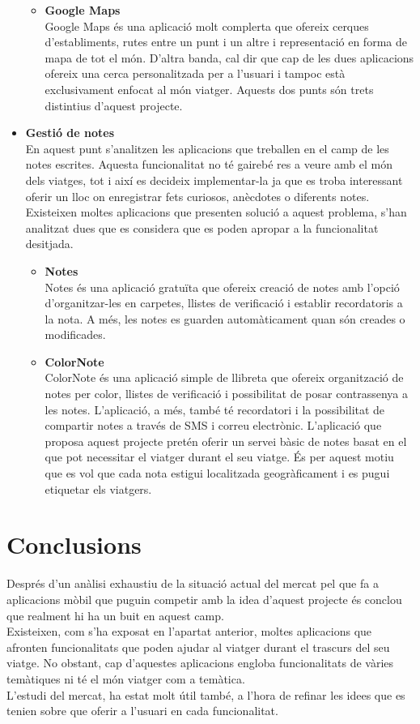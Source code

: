 \begin{itemize}
\begin{itemize}
\item{\textbf{Google Maps}}\\
Google Maps és una aplicació molt complerta que ofereix cerques d’establiments, rutes entre un punt i un altre i representació en forma de mapa de tot el món.
D’altra banda, cal dir que cap de les dues aplicacions ofereix una cerca personalitzada per a l’usuari i tampoc està exclusivament enfocat al món viatger. Aquests dos punts són trets distintius d’aquest projecte.
\end{itemize}
\item{\textbf{Gestió de notes}}\\
En aquest punt s’analitzen les aplicacions que treballen en el camp de les notes escrites. Aquesta funcionalitat no té gairebé res a veure amb el món dels viatges, tot i així es decideix implementar-la ja que es troba interessant oferir un lloc on enregistrar fets curiosos, anècdotes o diferents notes.\\
Existeixen moltes aplicacions que presenten solució a aquest problema, s’han analitzat dues que es considera que es poden apropar a la funcionalitat desitjada.
\begin{itemize}
\item{\textbf{Notes}}\\
Notes és una aplicació gratuïta que ofereix creació de notes amb l’opció d’organitzar-les en carpetes, llistes de verificació i establir recordatoris a la nota. A més, les notes es guarden automàticament quan són creades o modificades. 
\item{\textbf{ColorNote}}\\
ColorNote és una aplicació simple de llibreta que ofereix organització de notes per color, llistes de verificació i possibilitat de posar contrassenya a les notes. L’aplicació, a més, també té recordatori i la possibilitat de compartir notes a través de SMS i correu electrònic.
L’aplicació que proposa aquest projecte pretén oferir un servei bàsic de notes basat en el que pot necessitar el viatger durant el seu viatge. És per aquest motiu que es vol que cada nota estigui localitzada geogràficament i es pugui etiquetar els viatgers.
\end{itemize}
\end{itemize}
\section{Conclusions}
Després d'un anàlisi exhaustiu de la situació actual del mercat pel que fa a aplicacions mòbil que puguin competir amb la idea d'aquest projecte és conclou que realment hi ha un buit en aquest camp.\\

Existeixen, com s'ha exposat en l'apartat anterior, moltes aplicacions que afronten funcionalitats que poden ajudar al viatger durant el trascurs del seu viatge. No obstant, cap d'aquestes aplicacions engloba funcionalitats de vàries temàtiques ni té el món viatger com a temàtica.\\

L'estudi del mercat, ha estat molt útil també, a l'hora de refinar les idees que es tenien sobre que oferir a l'usuari en cada funcionalitat.
